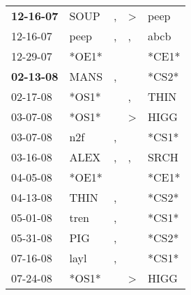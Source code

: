 \begin{supertabular}{p{0.07\textwidth}p{0.06\textwidth}p{0.02\textwidth}p{0.02\textwidth}p{0.06\textwidth}}
 \textbf{12-16-07\textsuperscript{}} &           SOUP\textsuperscript{} &                , &     \textgreater &           peep\textsuperscript{} \\
          12-16-07\textsuperscript{} &           peep\textsuperscript{} &                , &                , &           abcb\textsuperscript{} \\
          12-29-07\textsuperscript{} &                            *OE1* &                  &                  &                            *CE1* \\
 \textbf{02-13-08\textsuperscript{}} &           MANS\textsuperscript{} &                , &                  &                            *CS2* \\
          02-17-08\textsuperscript{} &                            *OS1* &                  &                , &           THIN\textsuperscript{} \\
          03-07-08\textsuperscript{} &                            *OS1* &                  &     \textgreater &           HIGG\textsuperscript{} \\
          03-07-08\textsuperscript{} &            n2f\textsuperscript{} &                , &                  &                            *CS1* \\
          03-16-08\textsuperscript{} &           ALEX\textsuperscript{} &                , &                , &           SRCH\textsuperscript{} \\
          04-05-08\textsuperscript{} &                            *OE1* &                  &                  &                            *CE1* \\
          04-13-08\textsuperscript{} &           THIN\textsuperscript{} &                , &                  &                            *CS2* \\
          05-01-08\textsuperscript{} &           tren\textsuperscript{} &                , &                  &                            *CS1* \\
          05-31-08\textsuperscript{} &            PIG\textsuperscript{} &                , &                  &                            *CS2* \\
          07-16-08\textsuperscript{} &           layl\textsuperscript{} &                , &                  &                            *CS1* \\
          07-24-08\textsuperscript{} &                            *OS1* &                  &     \textgreater &           HIGG\textsuperscript{} \\

\end{supertabular}
